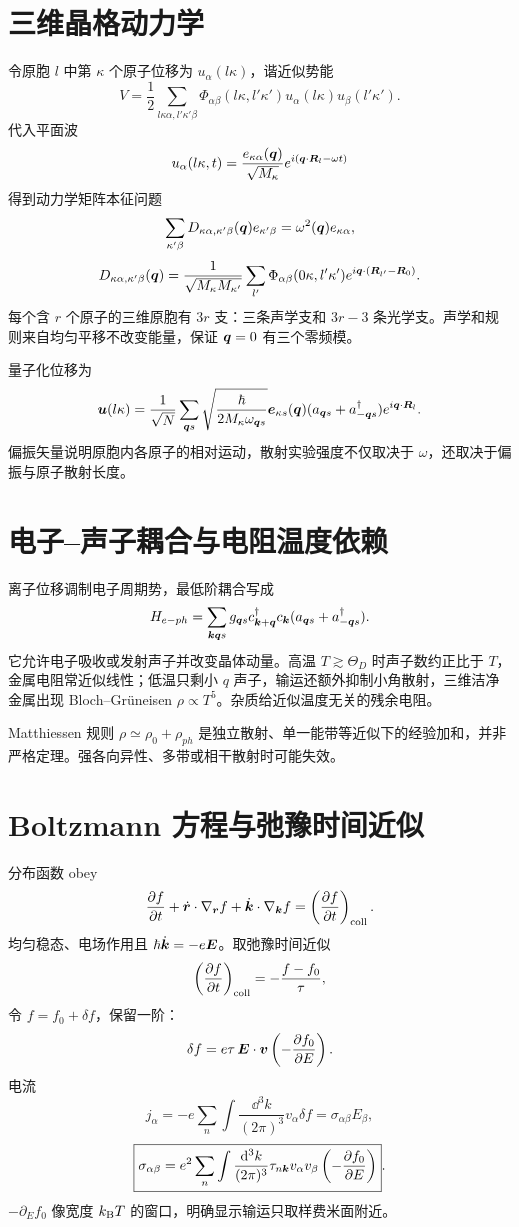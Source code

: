 \section{三维晶格动力学}
令原胞 $l$ 中第 $\kappa$ 个原子位移为 $u_\alpha(l\kappa)$，谐近似势能
\[
V=\frac12\sum_{l\kappa\alpha,l'\kappa'\beta}
\Phi_{\alpha\beta}(l\kappa,l'\kappa')
u_\alpha(l\kappa)u_\beta(l'\kappa').
\]
代入平面波
\[
u_\alpha(l\kappa,t)=\frac{e_{\kappa\alpha}(\bm{q})}
{\sqrt{M_\kappa}}e^{i(\bm{q}\cdot\bm{R}_l-\omega t)}
\]
得到动力学矩阵本征问题
\[
\sum_{\kappa'\beta}D_{\kappa\alpha,\kappa'\beta}(\bm{q})
e_{\kappa'\beta}=\omega^2(\bm{q})e_{\kappa\alpha},
\]
\[
D_{\kappa\alpha,\kappa'\beta}(\bm{q})=
\frac1{\sqrt{M_\kappa M_{\kappa'}}}
\sum_{l'}\Phi_{\alpha\beta}(0\kappa,l'\kappa')
e^{i\bm{q}\cdot(\bm{R}_{l'}-\bm{R}_0)}.
\]
每个含 $r$ 个原子的三维原胞有 $3r$ 支：三条声学支和 $3r-3$ 条光学支。声学和规则来自均匀平移不改变能量，保证 $\bm{q}=0$ 有三个零频模。

量子化位移为
\[
\bm{u}(l\kappa)=\frac1{\sqrt N}\sum_{\bm{q} s}
\sqrt{\frac{\hbar}{2M_\kappa\omega_{\bm{q} s}}}
\bm{e}_{\kappa s}(\bm{q})
(a_{\bm{q} s}+a_{-\bm{q} s}^\dagger)
e^{i\bm{q}\cdot\bm{R}_l}.
\]
偏振矢量说明原胞内各原子的相对运动，散射实验强度不仅取决于 $\omega$，还取决于偏振与原子散射长度。

\section{电子--声子耦合与电阻温度依赖}
离子位移调制电子周期势，最低阶耦合写成
\[
H_{e-ph}=\sum_{\bm{k}\bm{q} s}g_{\bm{q} s}
c_{\bm{k}+\bm{q}}^\dagger c_{\bm{k}}
(a_{\bm{q} s}+a_{-\bm{q} s}^\dagger).
\]
它允许电子吸收或发射声子并改变晶体动量。高温 $T\gtrsim\Theta_D$ 时声子数约正比于 $T$，金属电阻常近似线性；低温只剩小 $q$ 声子，输运还额外抑制小角散射，三维洁净金属出现 Bloch--Grüneisen
$\rho\propto T^5$。杂质给近似温度无关的残余电阻。

\begin{pitfallbox}
Matthiessen 规则 $\rho\simeq\rho_0+\rho_{ph}$ 是独立散射、单一能带等近似下的经验加和，并非严格定理。强各向异性、多带或相干散射时可能失效。
\end{pitfallbox}

\section{Boltzmann 方程与弛豫时间近似}
分布函数 obey
\[
\frac{\partial f}{\partial t}+\dot{\bm{r}}\cdot\nabla_{\bm{r}}f
+\dot{\bm{k}}\cdot\nabla_{\bm{k}}f
=\left(\frac{\partial f}{\partial t}\right)_{\rm coll}.
\]
均匀稳态、电场作用且
$\hbar\dot{\bm{k}}=-e\bm{E}$。取弛豫时间近似
\[
\left(\frac{\partial f}{\partial t}\right)_{\rm coll}=-\frac{f-f_0}{\tau},
\]
令 $f=f_0+\delta f$，保留一阶：
\[
\delta f=e\tau\,\bm{E}\cdot\bm{v}
\left(-\frac{\partial f_0}{\partial E}\right).
\]
电流
\[
j_\alpha=-e\sum_n\int\frac{\dd^3k}{(2\pi)^3}
v_\alpha\delta f
=\sigma_{\alpha\beta}E_\beta,
\]
\[
\boxed{\sigma_{\alpha\beta}=e^2\sum_n\int\frac{\mathrm d^3k}{(2\pi)^3}
\tau_{n\bm{k}}v_\alpha v_\beta
\left(-\frac{\partial f_0}{\partial E}\right)}.
\]
$-\partial_Ef_0$ 像宽度 $k_{\mathrm B} T$ 的窗口，明确显示输运只取样费米面附近。

